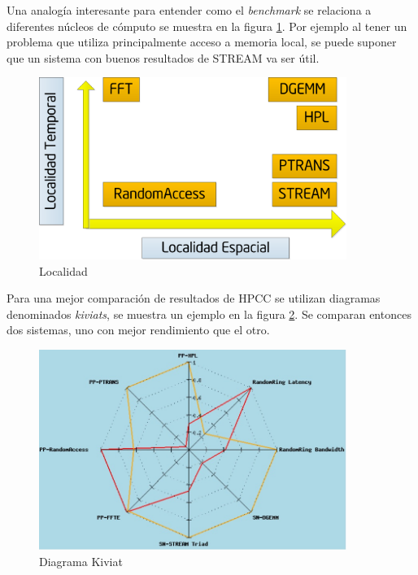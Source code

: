 \documentclass[a4paper]{report}
\begin{document}
\bigskip

Una analog\'ia interesante para entender como el {\it benchmark} se relaciona a diferentes n\'ucleos de c\'omputo
se muestra en la figura \ref{fig:locality}. Por ejemplo al tener un problema que
utiliza principalmente acceso a memoria local, se puede suponer que un sistema con
buenos resultados de STREAM va ser \'util.

\bigskip

\begin{figure}[H]
\begin{center}
\includegraphics[width=10cm]{locality.png}
\caption{Localidad}
\label{fig:locality}
\end{center}
\end{figure}

\bigskip

Para una mejor comparaci\'on de resultados de HPCC se utilizan diagramas
denominados {\it kiviats}, se muestra un ejemplo en la figura \ref{fig:kiviat}.
Se comparan entonces dos sistemas, uno con mejor rendimiento que el otro.

\begin{figure}[H]
\begin{center}
\includegraphics[width=10cm]{kiviat.png}
\caption{Diagrama Kiviat}
\label{fig:kiviat}
\end{center}
\end{figure}
\end{document}

